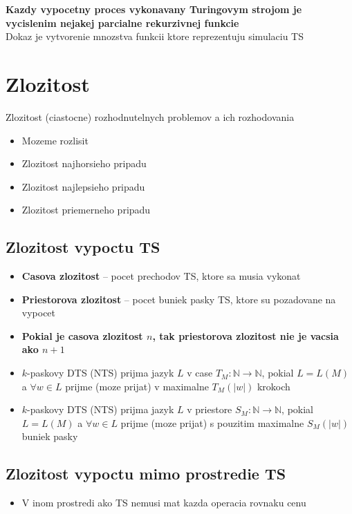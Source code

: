 \documentclass[12pt]{article}
\begin{document}
\textbf{Kazdy vypocetny proces vykonavany Turingovym strojom je vycislenim nejakej parcialne rekurzivnej funkcie}\\
Dokaz je vytvorenie mnozstva funkcii ktore reprezentuju simulaciu TS

\section{Zlozitost}
Zlozitost (ciastocne) rozhodnutelnych problemov a ich rozhodovania
\begin{itemize}
	\item Mozeme rozlisit
	\item Zlozitost najhorsieho pripadu
	\item Zlozitost najlepsieho pripadu
	\item Zlozitost priemerneho pripadu
\end{itemize}
\subsection*{Zlozitost vypoctu TS}
\begin{itemize}
	\item \textbf{Casova zlozitost} -- pocet prechodov TS, ktore sa musia vykonat
	\item \textbf{Priestorova zlozitost} -- pocet buniek pasky TS, ktore su pozadovane na vypocet
	\item \textbf{Pokial je casova zlozitost $n$, tak priestorova zlozitost nie je vacsia ako $n+1$}
	\item $k$-paskovy DTS (NTS) prijma jazyk $L$ v case $T_{M}: \mathbb{N} \to \mathbb{N}$, pokial
		$L = L(M)$ a $\forall w \in L$ prijme (moze prijat) v maximalne $T_{M}(|w|)$ krokoch
	\item $k$-paskovy DTS (NTS) prijma jazyk $L$ v priestore $S_{M}: \mathbb{N} \to \mathbb{N}$, pokial
		$L = L(M)$ a $\forall w \in L$ prijme (moze prijat) s pouzitim maximalne $S_{M}(|w|)$ buniek pasky
\end{itemize}
\subsection*{Zlozitost vypoctu mimo prostredie TS}
\begin{itemize}
	\item V inom prostredi ako TS nemusi mat kazda operacia rovnaku cenu
\end{itemize}
\end{document}
